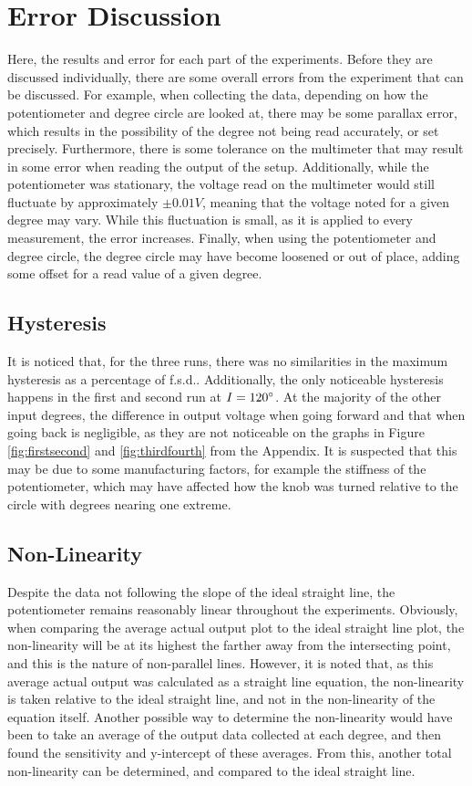 \documentclass[a4,11pt]{article}
\begin{document}
\section{Error Discussion}
Here, the results and error for each part of the experiments. Before they are discussed individually, there are some overall errors from the experiment that can be discussed. For example, when collecting the data, depending on how the potentiometer and degree circle are looked at, there may be some parallax error, which results in the possibility of the degree not being read accurately, or set precisely. Furthermore, there is some tolerance on the multimeter that may result in some error when reading the output of the setup. Additionally, while the potentiometer was stationary, the voltage read on the multimeter would still fluctuate by approximately $\pm0.01V$, meaning that the voltage noted for a given degree may vary. While this fluctuation is small, as it is applied to every measurement, the error increases. Finally, when using the potentiometer and degree circle, the degree circle may have become loosened or out of place, adding some offset for a read value of a given degree.
\subsection{Hysteresis}
It is noticed that, for the three runs, there was no similarities in the maximum hysteresis as a percentage of f.s.d.. Additionally, the only noticeable hysteresis happens in the first and second run at $I=120\degree$. At the majority of the other input degrees, the difference in output voltage when going forward and that when going back is negligible, as they are not noticeable on the graphs in Figure \ref{fig:firstsecond} and \ref{fig:thirdfourth} from the Appendix. It is suspected that this may be due to some manufacturing factors, for example the stiffness of the potentiometer, which may have affected how the knob was turned relative to the circle with degrees nearing one extreme.
\subsection{Non-Linearity}
Despite the data not following the slope of the ideal straight line, the potentiometer remains reasonably linear throughout the experiments. Obviously, when comparing the average actual output plot to the ideal straight line plot, the non-linearity will be at its highest the farther away from the intersecting point, and this is the nature of non-parallel lines. However, it is noted that, as this average actual output was calculated as a straight line equation, the non-linearity is taken relative to the ideal straight line, and not in the non-linearity of the equation itself. Another possible way to determine the non-linearity would have been to take an average of the output data collected at each degree, and then found the sensitivity and y-intercept of these averages. From this, another total non-linearity can be determined, and compared to the ideal straight line.	
\end{document}
